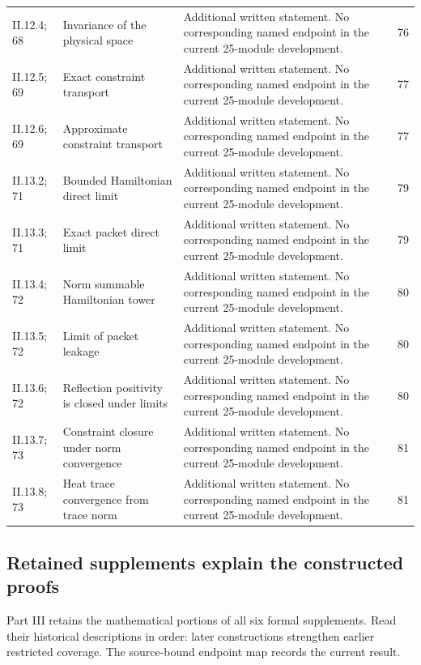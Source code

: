 {\begin{longtable}{@{}p{.13\linewidth}p{.31\linewidth}p{.42\linewidth}r@{}}
II.12.4; 68 & Invariance of the physical space & Additional written statement. No corresponding named endpoint in the current 25-module development. & 76\\
II.12.5; 69 & Exact constraint transport & Additional written statement. No corresponding named endpoint in the current 25-module development. & 77\\
II.12.6; 69 & Approximate constraint transport & Additional written statement. No corresponding named endpoint in the current 25-module development. & 77\\
II.13.2; 71 & Bounded Hamiltonian direct limit & Additional written statement. No corresponding named endpoint in the current 25-module development. & 79\\
II.13.3; 71 & Exact packet direct limit & Additional written statement. No corresponding named endpoint in the current 25-module development. & 79\\
II.13.4; 72 & Norm summable Hamiltonian tower & Additional written statement. No corresponding named endpoint in the current 25-module development. & 80\\
II.13.5; 72 & Limit of packet leakage & Additional written statement. No corresponding named endpoint in the current 25-module development. & 80\\
II.13.6; 72 & Reflection positivity is closed under limits & Additional written statement. No corresponding named endpoint in the current 25-module development. & 80\\
II.13.7; 73 & Constraint closure under norm convergence & Additional written statement. No corresponding named endpoint in the current 25-module development. & 81\\
II.13.8; 73 & Heat trace convergence from trace norm & Additional written statement. No corresponding named endpoint in the current 25-module development. & 81\\
\bottomrule\end{longtable}}
\subsection{Retained supplements explain the constructed proofs}
Part III retains the mathematical portions of all six formal supplements. Read their historical descriptions in order: later constructions strengthen earlier restricted coverage. The source-bound endpoint map records the current result.

